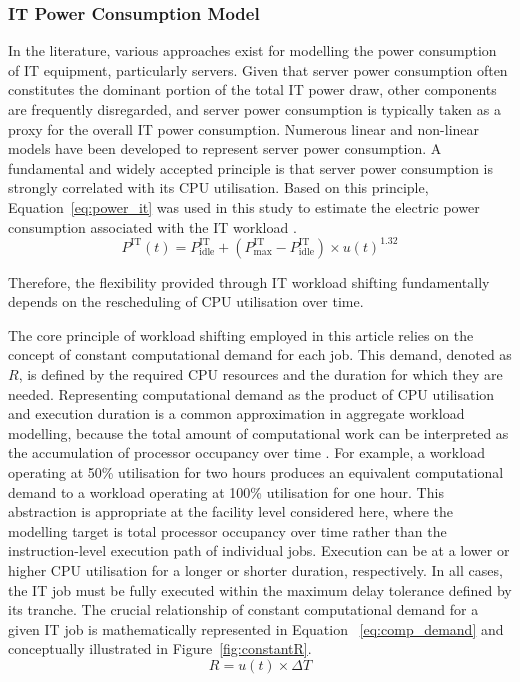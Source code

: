 \documentclass[lettersize,journal]{IEEEtran}
\providecommand{\DIFadd}[1]{{\color{blue}#1}}
\providecommand{\DIFaddbegin}{}
\providecommand{\DIFaddend}{}
\begin{document}
\subsubsection{IT Power Consumption Model}

 In the literature, various approaches exist for modelling the power consumption of IT equipment, particularly servers. Given that server power consumption often constitutes the dominant portion of the total IT power draw, other components are frequently disregarded, and server power consumption is typically taken as a proxy for the overall IT power consumption. Numerous linear and non-linear models have been developed to represent server power consumption. A fundamental and widely accepted principle is that server power consumption is strongly correlated with its CPU utilisation.  \DIFaddbegin \DIFadd{Based on this principle, Equation~\eqref{eq:power_it} }\DIFaddend was used in this study to estimate the electric power consumption associated with the IT workload \cite{dayarathna2015data,v2015analysis}.
\begin{equation}
P^{\mathrm{IT}}(t) = P^{\mathrm{IT}}_{\mathrm{idle}} + (P^{\mathrm{IT}}_{\mathrm{max}} - P^{\mathrm{IT}}_{\mathrm{idle}}) \times u(t)^{1.32}
\label{eq:power_it}
\end{equation}



Therefore, the flexibility provided through IT workload shifting fundamentally depends on the rescheduling of CPU utilisation over time.

The core principle of workload shifting employed in this article relies on the concept of constant computational demand for each job. This demand, denoted as $R$, is defined by the required CPU resources and the duration for which they are needed. \DIFaddbegin \DIFadd{Representing computational demand as the product of CPU utilisation and execution duration is a common approximation in aggregate workload modelling, because the total amount of computational work can be interpreted as the accumulation of processor occupancy over time \cite{dayarathna2015data,6779441,Cao2022ApEn}. For example, a workload operating at 50\% utilisation for two hours produces an equivalent computational demand to a workload operating at 100\% utilisation for one hour. This abstraction is appropriate at the facility level considered here, where the modelling target is total processor occupancy over time rather than the instruction-level execution path of individual jobs. }\DIFaddend Execution can be at a lower or higher CPU utilisation for a longer or shorter duration\DIFaddbegin \DIFadd{, }\DIFaddend respectively. In all cases, the IT job must be fully executed within the maximum delay tolerance defined by its tranche. The crucial relationship of constant computational demand for a given IT job is mathematically represented in Equation~ \DIFaddbegin \DIFadd{\eqref{eq:comp_demand} }\DIFaddend and conceptually illustrated in Figure~\ref{fig:constantR}.
\begin{equation}
R = u(t) \times \Delta T
\label{eq:comp_demand}
\end{equation}
\end{document}
